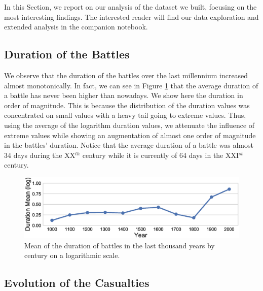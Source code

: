 In this Section, we report on our analysis of the dataset we built, focusing on the most interesting findings. The interested reader will find our data exploration and extended analysis in the companion notebook.

\subsection{Duration of the Battles}

We observe that the duration of the battles over the last millennium increased almost monotonically. In fact, we can see in Figure \ref{fig:durThByCent} that the average duration of a battle has never been higher than nowadays. We show here the duration in order of magnitude. This is because the distribution of the duration values was concentrated on small values with a heavy tail going to extreme values. Thus, using the average of the logarithm duration values, we attenuate the influence of extreme values while showing an augmentation of almost one order of magnitude in the battles' duration. Notice that the average duration of a battle was almost 34 days during the XX$^{th}$ century while it is currently of 64 days in the XXI$^{st}$ century.

 \begin{figure}[h]
	\centering	\includegraphics[width=\linewidth]{figures/durThByCent}
	\caption{Mean of the duration of battles in the last thousand years by century on a logarithmic scale.}\label{fig:durThByCent}
	\centering
\end{figure}

\subsection{Evolution of the Casualties}

